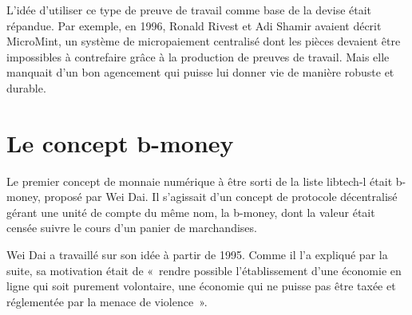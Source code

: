 
L'idée d'utiliser ce type de preuve de travail comme base de la devise était répandue. Par exemple, en 1996, Ronald Rivest et Adi Shamir avaient décrit MicroMint, un système de micropaiement centralisé dont les pièces devaient être impossibles à contrefaire grâce à la production de preuves de travail. Mais elle manquait d'un bon agencement qui puisse lui donner vie de manière robuste et durable.

\section*{Le concept b-money} %

Le premier concept de monnaie numérique à être sorti de la liste libtech-l était b-money, proposé par Wei Dai. Il s'agissait d'un concept de protocole décentralisé gérant une unité de compte du même nom, la b-money, dont la valeur était censée suivre le cours d'un panier de marchandises.

Wei Dai a travaillé sur son idée à partir de 1995. Comme il l'a expliqué par la suite, sa motivation était de «~rendre possible l'établissement d'une économie en ligne qui soit purement volontaire, une économie qui ne puisse pas être taxée et réglementée par la menace de violence~». %

